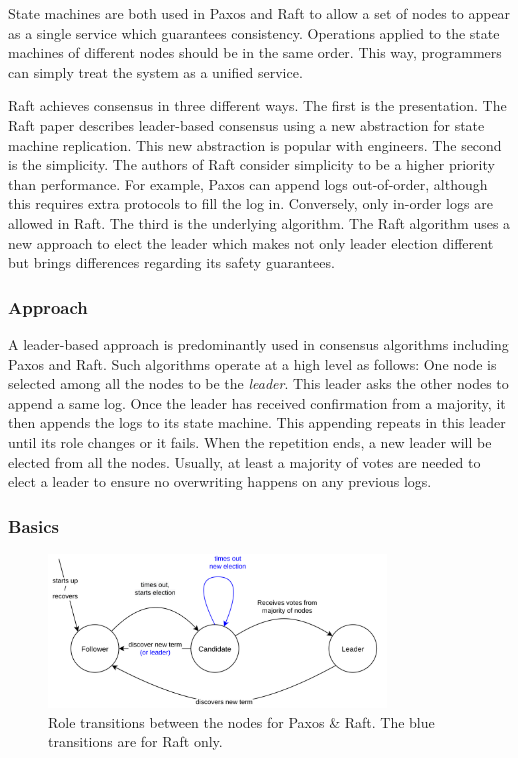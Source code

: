\documentclass[12pt, a4paper]{article}
\begin{document}
State machines are both used in Paxos and Raft to allow a set of nodes to appear as a single service which guarantees consistency. Operations applied to the state machines of different nodes should be in the same order. This way, programmers can simply treat the system as a unified service.

Raft achieves consensus in three different ways.
The first is the presentation. The Raft paper describes leader-based consensus using a new abstraction for state machine replication.
This new abstraction is popular with engineers.
The second is the simplicity. The authors of Raft consider simplicity to be a higher priority than performance. For example, Paxos can append logs out-of-order, although this requires extra protocols to fill the log in.
Conversely, only in-order logs are allowed in Raft.
The third is the underlying algorithm. The Raft algorithm uses a new approach to
elect the leader which makes not only leader election different
but brings differences regarding its safety guarantees.

\subsubsection{Approach}
A leader-based approach is predominantly used in consensus algorithms including Paxos and Raft.
Such algorithms operate at a high level as follows:
One node is selected among all the nodes to be the \textit{leader}.
This leader asks the other nodes to append a same log.
Once the leader has received confirmation from a majority,
it then appends the logs to its state machine.
This appending repeats in this leader until its role changes or it fails.
When the repetition ends, a new leader will be elected from all the nodes.
Usually, at least a majority of votes are needed to elect a leader
to ensure no overwriting happens on any previous logs.

\subsubsection{Basics}

\begin{figure}[htp]
\begin{center}
  \centering
  \includegraphics[width=0.8\textwidth]{img/roles-transitions.png}
  \caption{Role transitions between the nodes for Paxos \& Raft. The blue transitions are for Raft only.}
  \label{fig:roles-transitions}
\end{center}
\end{figure}
\end{document}
